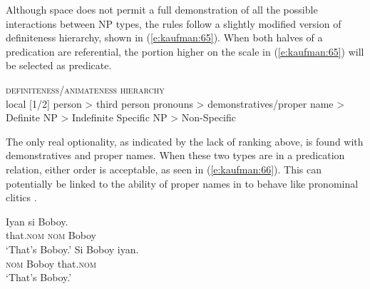 \documentclass[output=paper]{langsci/langscibook}
\begin{document}
\noindent
Although space does not permit a full demonstration of all the possible interactions between NP types, the rules follow a slightly modified version of  definiteness hierarchy, shown in (\ref{e:kaufman:65}). When both halves of a predication are referential, the portion higher on the scale in (\ref{e:kaufman:65}) will be selected as predicate. 

\begin{exe}
	\ex\label{e:kaufman:65}{\textsc{definiteness/animateness hierarchy}} \citep{Silverstein:1976, Aissen:1999, Aissen:2003}\\
	local [1/2] person > third person pronouns > demonstratives/proper name > Definite NP > Indefinite Specific NP > Non-Specific
\end{exe}

\noindent
The only real optionality, as indicated by the lack of ranking above, is found with demonstratives and proper names. When these two types are in a predication relation, either order is acceptable, as seen in (\ref{e:kaufman:66}). This can potentially be linked to the ability of proper names in  to behave like pronominal clitics \citep{Billings:2005}.

\begin{exe}
	\ex\label{e:kaufman:66}
	\begin{xlist}
		\ex\label{e:kaufman:66a}
        \gll Iyan si Boboy.\\
		that.\textsc{nom} \textsc{nom} Boboy\\
		\glt `That's Boboy.'
		\ex\label{e:kaufman:66b}
        \gll Si Boboy iyan.\\
		\textsc{nom} Boboy that.\textsc{nom}\\
		\glt `That's Boboy.'
	\end{xlist}
\end{exe}
\end{document}
